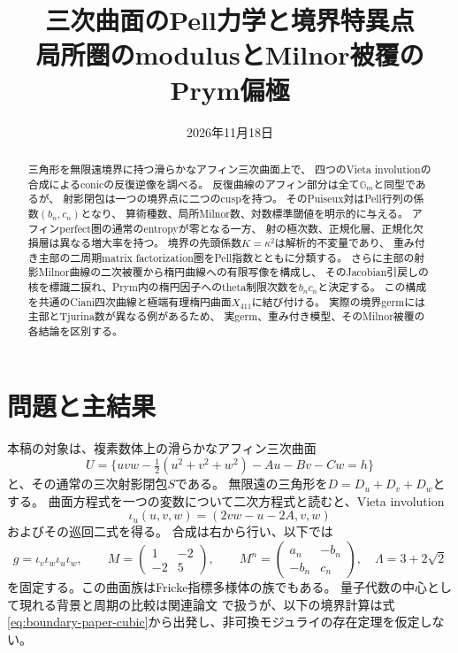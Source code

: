 \documentclass[11pt,a4paper]{ltjsarticle}
\title{三次曲面のPell力学と境界特異点\\\large 局所圏のmodulusとMilnor被覆のPrym偏極}
\author{}
\date{2026年11月18日\quad \PublicationVersion}
\begin{document}
\maketitle
\begin{abstract}
三角形を無限遠境界に持つ滑らかなアフィン三次曲面上で、
四つのVieta involutionの合成によるconicの反復逆像を調べる。
反復曲線のアフィン部分は全て$\mathbb G_m$と同型であるが、
射影閉包は一つの境界点に二つのcuspを持つ。
そのPuiseux対はPell行列の係数$(b_n,c_n)$となり、
算術種数、局所Milnor数、対数標準閾値を明示的に与える。
アフィンperfect圏の通常のentropyが零となる一方、
射の極次数、正規化層、正規化欠損層は異なる増大率を持つ。
境界の先頭係数$K=\kappa^2$は解析的不変量であり、
重み付き主部の二周期matrix factorization圏をPell指数とともに分類する。
さらに主部の射影Milnor曲線の二次被覆から楕円曲線への有限写像を構成し、
そのJacobian引戻しの核を標識二捩れ、Prym内の楕円因子へのtheta制限次数を$b_nc_n$と決定する。
この構成を共通のCiani四次曲線と極端有理楕円曲面$X_{411}$に結び付ける。
実際の境界germには主部とTjurina数が異なる例があるため、
実germ、重み付き模型、そのMilnor被覆の各結論を区別する。
\end{abstract}
\tableofcontents

\section{問題と主結果}
本稿の対象は、複素数体上の滑らかなアフィン三次曲面
\begin{equation}\label{eq:boundary-paper-cubic}
 U=\{uvw-\tfrac12(u^2+v^2+w^2)-Au-Bv-Cw=h\}
\end{equation}
と、その通常の三次射影閉包$S$である。
無限遠の三角形を$D=D_u+D_v+D_w$とする。
曲面方程式を一つの変数について二次方程式と読むと、Vieta involution
\[
 \iota_u(u,v,w)=(2vw-u-2A,v,w)
\]
およびその巡回二式を得る。
合成は右から行い、以下では
\begin{equation}\label{eq:boundary-paper-word}
 g=\iota_v\iota_w\iota_u\iota_w,\qquad
 M=\begin{pmatrix}1&-2\\-2&5\end{pmatrix},\qquad
 M^n=\begin{pmatrix}a_n&-b_n\\-b_n&c_n\end{pmatrix},
 \quad \Lambda=3+2\sqrt2
\end{equation}
を固定する。この曲面族はFricke指標多様体の族でもある。
量子代数の中心として現れる背景と周期の比較は関連論文
\cite{CompanionFricke}で扱うが、以下の境界計算は式
\eqref{eq:boundary-paper-cubic}から出発し、非可換モジュライの存在定理を仮定しない。
\end{document}
